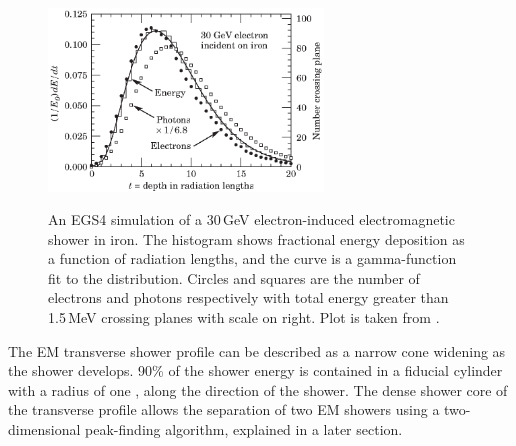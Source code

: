 
\begin{figure}[tbph]
\centering
{\includegraphics[width=0.65\textwidth]{photon/EMlong}}
\caption[Simulated longitudinal electromagnetic shower profile as a function of depth for electrons and photons.]
{An EGS4 simulation of a 30\,GeV electron-induced electromagnetic shower in iron. The histogram shows fractional energy deposition as a function of radiation lengths, and the curve is a gamma-function fit to the distribution. Circles and squares are the number of electrons and photons respectively with total energy greater than 1.5\,MeV crossing planes with scale on right. Plot is taken from \cite{Agashe:2014kda}.}
\label{fig:photonEMlongProfile}
\end{figure}

The EM transverse shower profile can be described as  a narrow cone widening as the shower develops. 90\% of the shower energy  is contained in a fiducial cylinder with a radius of one \RM, along the direction of the shower. The dense shower core of the transverse profile allows the separation of two EM showers using a two-dimensional peak-finding algorithm, explained in a later section.





